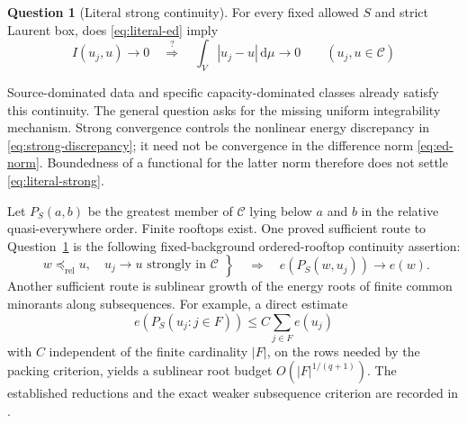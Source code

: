 \documentclass[11pt,a4paper]{article}
\newcommand{\MathEqref}[1]{{\hypersetup{linkcolor=EquationLink}\eqref{#1}}}
\newcommand{\Questref}[1]{Question~\ref{#1}}
\theoremstyle{definition}
\newtheorem{question}[theorem]{Question}
\theoremstyle{remark}
\numberwithin{equation}{section}
\newcommand{\dd}{\mathrm d}
\newcommand{\C}{\mathscr C}
\newcommand{\rel}{\mathrm{rel}}
\begin{document}
\begin{question}[Literal strong continuity]
\label{question:literal}
For every fixed allowed $S$ and strict Laurent box, does
\MathEqref{eq:literal-ed} imply
\begin{equation}
       I(u_j,u)\longrightarrow0\quad\overset{?}{\Longrightarrow}\quad
       \int_V|u_j-u|\,\dd\mu\longrightarrow0
                       \qquad(u_j,u\in\C)
                         \label{eq:literal-strong}
\end{equation}
\end{question}

Source-dominated data and specific capacity-dominated classes already
satisfy this continuity.  The general question asks for the missing
uniform integrability mechanism.  Strong convergence controls the
nonlinear energy discrepancy in \MathEqref{eq:strong-discrepancy};
it need not be convergence in the difference norm
\MathEqref{eq:ed-norm}.  Boundedness of a functional for the latter
norm therefore does not settle \MathEqref{eq:literal-strong}.

Let $P_S(a,b)$ be the greatest member of $\C$ lying below $a$ and $b$
in the relative quasi-everywhere order.  Finite rooftops exist.  One
proved sufficient route to \Questref{question:literal} is the
following fixed-background ordered-rooftop continuity assertion:
\begin{equation}
 \left.
 \begin{gathered}
       w\preceq_{\rel}u,\quad u_j\longrightarrow u
                              \text{ strongly in }\C
 \end{gathered}\right\}
 \quad\Longrightarrow\quad
                  e(P_S(w,u_j))\longrightarrow e(w).
                         \label{eq:ordered-rooftop}
\end{equation}
Another sufficient route is sublinear growth of the energy roots of
finite common minorants along subsequences.  For example, a direct
estimate
\begin{equation}
 e(P_S(u_j:j\in F))\le C\sum_{j\in F}e(u_j)
                         \label{eq:finite-rooftop-budget}
\end{equation}
with $C$ independent of the finite cardinality $|F|$, on the rows
needed by the packing criterion, yields a sublinear root budget
$O(|F|^{1/(q+1)})$.  The established reductions and the exact weaker
subsequence criterion are recorded in \cite{Rchain,Rooftop}.
\end{document}
